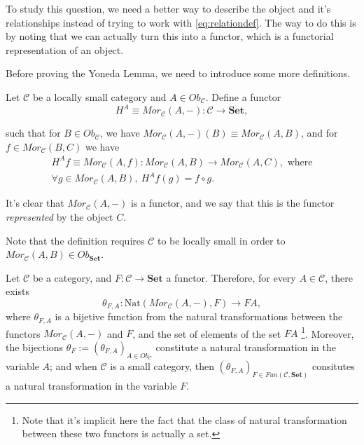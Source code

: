To study this question, we need a better way to describe the object and it's relationships
instead of trying to work with \eqref{eq:relationdef}. The way to do this is
by noting that we can actually turn this into a functor, which is
a functorial representation of an object.

Before proving the Yoneda Lemma, we need to introduce some more definitions.

\begin{definition}
	Let $\mathcal C$ be a locally small category and $A \in Ob_\mathcal C$.
	Define a functor
	\begin{displaymath}
		H^A \equiv Mor_\mathcal C(A,-): \mathcal C \to \mathbf{Set},
	\end{displaymath}

	such that for $B \in Ob_\mathcal C$, we have $Mor_\mathcal C (A,-)(B) \equiv Mor_\mathcal C (A,B)$, and
	for $ f \in Mor_\mathcal C (B,C)$ we have
	\begin{gather*}
		H^A f \equiv Mor_\mathcal C(A,f) : Mor_\mathcal C(A,B) \to Mor_\mathcal C(A,C), \text{ where} \\
		\forall g \in Mor_\mathcal C(A,B) , \ H^A f (g) = f \circ g.
	\end{gather*}

	It's clear that $Mor_\mathcal C(A,-)$ is a functor, and we say that this is the functor
	\textit{represented} by the object $C$.
\end{definition}
Note that the definition requires $\mathcal C$ to be locally small in order to $Mor_\mathcal C (A,B) \in Ob_{\mathbf{Set}}$.

\begin{lemma}
	Let $\mathcal C$ be a category, and $F:\mathcal C \to \mathbf{Set}$ a functor.
	Therefore, for every $A \in \mathcal C$, there exists
	\begin{displaymath}
		\theta_{F,A}: \text{Nat}(Mor_\mathcal C (A, -), F) \to FA,
	\end{displaymath}
	where $\theta_{F,A}$ is a bijetive function from the natural transformations
	between the functors $Mor_\mathcal C (A, -)$ and $F$, and the set of elements of the set $FA$
	\footnote{Note that it's implicit here the fact that the class of natural transformation between
		these two functors is actually a set.}.
	Moreover, the bijections $\theta_F := (\theta_{F,A})_{A \in Ob_\mathcal C}$ constitute a natural transformation
	in the variable $A$; and when $\mathcal C$ is a small category,
	then $(\theta_{F,A})_{F \in Fun(\mathcal C, \mathbf{Set})}$
	consitutes a natural transformation in the variable $F$.
\end{lemma}

